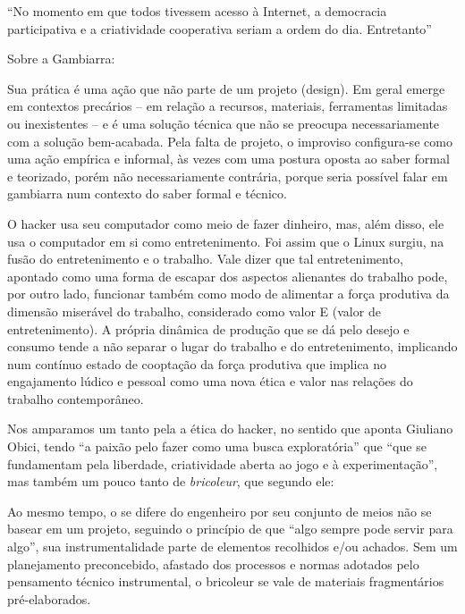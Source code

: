 ``No momento em que todos tivessem acesso à Internet, a democracia participativa e a criatividade cooperativa seriam a ordem do dia. Entretanto'' \cite[360]{Barbrook2009}


Sobre a Gambiarra:

\begin{citacao}
Sua prática é uma ação que não parte de um projeto (design). Em geral emerge em contextos precários – em relação a recursos, materiais, ferramentas limitadas ou inexistentes – e é uma solução técnica que não se preocupa necessariamente com a solução bem-acabada. Pela falta de projeto, o improviso configura-se como uma ação empírica e informal, às vezes com uma postura oposta ao saber formal e teorizado, porém não necessariamente contrária, porque seria possível falar em gambiarra num contexto do saber formal e técnico. \cite[7]{Obici2014}
\end{citacao}





\begin{citacao}
O hacker usa seu computador como meio de fazer dinheiro, mas, além disso, ele usa o computador em si como entretenimento. Foi assim que o Linux surgiu, na fusão do entretenimento e o trabalho.
Vale dizer que tal entretenimento, apontado como uma forma de escapar dos aspectos alienantes do trabalho pode, por outro lado, funcionar também como modo de alimentar a força produtiva da dimensão miserável do trabalho, considerado como valor E (valor de entretenimento). A própria dinâmica de produção que se dá pelo desejo e consumo tende a não separar o lugar do trabalho e do entretenimento, implicando num contínuo estado de cooptação da força produtiva que implica no engajamento lúdico e pessoal como uma nova ética e valor nas relações do trabalho contemporâneo. \cite[24]{Obici2014}
\end{citacao}

Nos amparamos um tanto pela a ética do hacker, no sentido que aponta Giuliano Obici, tendo ``a paixão pelo fazer como uma busca exploratória'' que ``que se fundamentam pela liberdade, criatividade aberta ao jogo e à experimentação''\cite[366]{Obici2014}, mas também um pouco tanto de \emph{bricoleur}, que segundo ele:

Ao mesmo tempo, o  se difere do engenheiro por seu conjunto de meios não se basear em um projeto, seguindo o princípio de que “algo sempre pode servir para algo”, sua instrumentalidade parte de elementos recolhidos e/ou achados. Sem um planejamento preconcebido, afastado dos processos e normas adotados pelo pensamento técnico instrumental, o bricoleur se vale de materiais fragmentários pré-elaborados.



